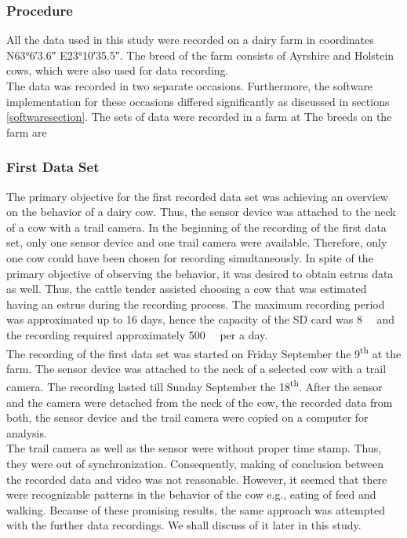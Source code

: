 \documentclass[english,12pt,a4paper,pdftex,elec,utf8]{aaltothesis}
\begin{document}
\subsubsection{Procedure}

All the data used in this study were recorded on a dairy farm in coordinates N\ang{63;6;3.6} E\ang{23;10;35.5}. The breed of the farm consists of Ayrshire and Holstein cows, which were also used for data recording. \\

The data was recorded in two separate occasions. Furthermore, the software implementation for these occasions differed significantly as discussed in sections \ref{softwaresection}. The sets of data were recorded in a farm at  The breeds on the farm are \\


\subsubsection*{First Data Set} \label{firstdatasetsection}




The primary objective for the first recorded data set was achieving an overview on the behavior of a dairy cow. Thus, the sensor device was attached to the neck of a cow with a trail camera. In the beginning of the recording of the first data set, only one sensor device and one trail camera were available. Therefore, only one cow could have been chosen for recording simultaneously. In spite of the primary objective of observing the behavior, it was desired to obtain estrus data as well. Thus, the cattle tender assisted choosing a cow that was estimated having an estrus during the recording process. The maximum recording period was approximated up to 16 days, hence the capacity of the SD card was \SI{8}{\giga \byte} and the recording required approximately \SI{500}{\mega \byte} per a day. \\

The recording of the first data set was started on Friday September the 9\textsuperscript{th} at the farm. The sensor device was attached to the neck of a selected cow with a trail camera. The recording lasted till Sunday September the 18\textsuperscript{th}. After the sensor and the camera were detached from the neck of the cow, the recorded data from both, the sensor device and the trail camera were copied on a computer for analysis. \\

The trail camera as well as the sensor were without proper time stamp. Thus, they were out of synchronization. Consequently, making of conclusion between the recorded data and video was not reasonable. However, it seemed that there were recognizable patterns in the behavior of the cow e.g., eating of feed and walking. Because of these promising results, the same approach was attempted with the further data recordings. We shall discuss of it later in this study.
\\
\end{document}

